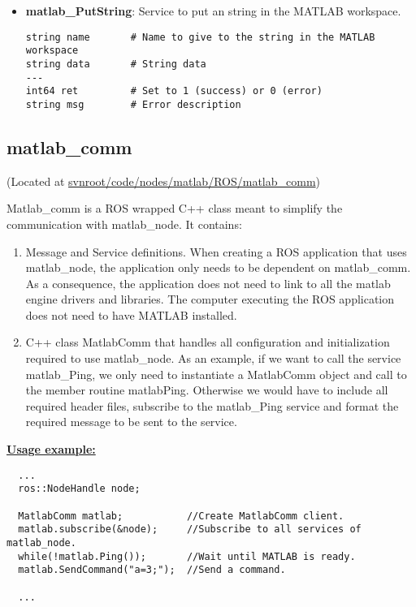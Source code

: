 \documentclass[letterpaper,notitlepage,11pt]{article}
\begin{document}
\begin{itemize}
\item \textbf{matlab\_PutString}: Service to put an string in the
  MATLAB workspace.

\begin{verbatim}
string name       # Name to give to the string in the MATLAB workspace
string data       # String data
---
int64 ret         # Set to 1 (success) or 0 (error)
string msg        # Error description
\end{verbatim}
\end{itemize}


\subsection{matlab\_comm}
\noindent (Located at \url{svnroot/code/nodes/matlab/ROS/matlab_comm})

\noindent Matlab\_comm is a ROS wrapped C++ class meant to simplify the
communication with matlab\_node. It contains:

\begin{enumerate}
\item Message and Service definitions. When creating a ROS application
  that uses matlab\_node, the application only needs to be dependent
  on matlab\_comm. As a consequence, the application does not need to
  link to all the matlab engine drivers and libraries. The computer
  executing the ROS application does not need to have MATLAB installed.
\item C++ class MatlabComm that handles all configuration and
  initialization required to use matlab\_node. As an example, if we want
  to call the service matlab\_Ping, we only need to instantiate a MatlabComm
  object and call to the member routine matlabPing. Otherwise
  we would have to include all required header files, subscribe to the
  matlab\_Ping service and format the required message to be sent to the
  service.
\end{enumerate}

\textbf{\underline{Usage example:}}

\begin{verbatim}
  ...
  ros::NodeHandle node;
 
  MatlabComm matlab;           //Create MatlabComm client.
  matlab.subscribe(&node);     //Subscribe to all services of matlab_node.
  while(!matlab.Ping());       //Wait until MATLAB is ready.
  matlab.SendCommand("a=3;");  //Send a command.

  ...
\end{verbatim}
\end{document}
